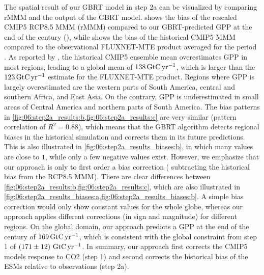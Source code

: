The spatial result of our \ac{GBRT} model in step 2a can be visualized by
comparing r\acs{MMM} and the output of the \acs{GBRT} model.
 shows the bias of the rescaled \acs{CMIP}5
\acs{RCP}8.5 \ac{MMM} (r\acs{MMM}) compared to our \acs{GBRT}-predicted
\ac{GPP} at the end of the  century (), while
 shows the bias of the historical \acs{CMIP}5
\ac{MMM} compared to the observational FLUXNET-MTE product \autocite{Jung2011}
averaged for the period . As reported by \textcite{Anav2013},
the historical \acs{CMIP}5 ensemble mean overestimates \ac{GPP} in most
regions, leading to a global mean of $138 \unit{\GtCyr{}}$, which is larger
than the $123 \unit{\GtCyr{}}$ estimate for the FLUXNET-MTE product. Regions
where \ac{GPP} is largely overestimated are the western parts of South America,
central and southern Africa, and East Asia. On the contrary, \ac{GPP} is
underestimated in small areas of Central America and northern parts of South
America. The bias patterns in
\cref{fig:06:step2a_results:b,fig:06:step2a_results:c} are very similar
(pattern correlation of $R^2 = 0.88$), which means that the \ac{GBRT} algorithm
detects regional biases in the historical simulation and corrects them in its
future predictions. This is also illustrated in
\cref{fig:06:step2a_results_biases:b}, in which many values are close to $1$,
while only a few negative values exist. However, we emphasize that our approach
is only to first order a bias correction (\ie{} subtracting the historical bias
from the \acs{RCP}8.5 \ac{MMM}). There are clear differences between
\cref{fig:06:step2a_results:b,fig:06:step2a_results:c}, which are also
illustrated in
\cref{fig:06:step2a_results_biases:a,fig:06:step2a_results_biases:b}. A simple
bias correction would only show constant values for the whole globe, whereas
our approach applies different corrections (in sign and magnitude) for
different regions. On the global domain, our approach predicts a \ac{GPP} at
the end of the century of $169 \unit{\GtCyr{}}$, which is consistent with the
global constraint from step 1 of $\pmrangeunit{171}{12}{\GtCyr{}}$. In summary,
our approach first corrects the \acs{CMIP}5 models response to \ac{CO2} (step
1) and second corrects the historical bias of the \acp{ESM} relative to
observations (step 2a).

